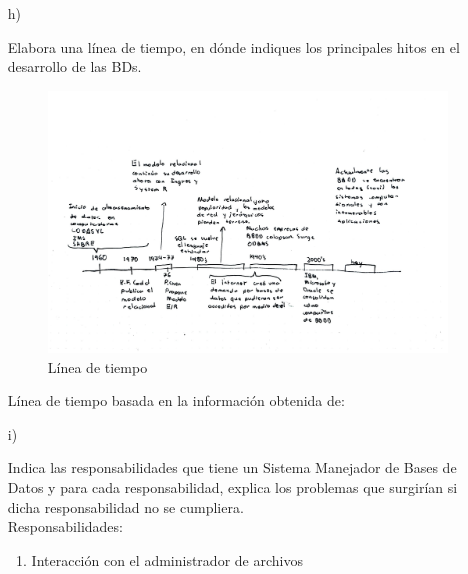 \documentclass[a4paper, 12pt]{report}
\begin{document}
\begin{enumerate}
{\begin{enumerate}
{    es un sistema cerrado, todas las operaciones son siempre tablas.\\
    \textbf{Modelo Orientado a Objetos.} Los datos se modelan como
    objetos, se tiene comportamiento (métodos o funciones) y estado.\\
    \textbf{Modelo Semiestructurado.} Es una colección de nodos y
    cada nodo tiene datos con diferentes esquemas, esto lo hace un
    sistema menos rígido.\\
    \textbf{Modelo Objeto-Relacional} Representa los datos como tablas,
    permite construir tipos de objetos complejos, capacidad para
    encapsular y asociar métodos a los objetos.}
    \item[h)]{Elabora una línea de tiempo, en dónde indiques los principales
              hitos en el desarrollo de las BDs.\\
        \begin{figure}[ht!]
            \centering
            \includegraphics[width=\textwidth]{Linea_de_tiempo_BD.jpg}
            \caption{Línea de tiempo }
        \end{figure}
        Línea de tiempo basada en la información obtenida de: \cite{DBH}
    }
    \item[i)]{Indica las responsabilidades que tiene un Sistema Manejador de
                Bases de Datos y para cada responsabilidad, explica los problemas
                que surgirían si dicha responsabilidad no se cumpliera.\\
        Responsabilidades:\\
        \begin{enumerate}
            \item{Interacción con el administrador de archivos}

\end{enumerate}}
\end{enumerate}}
\end{enumerate}
\end{document}
